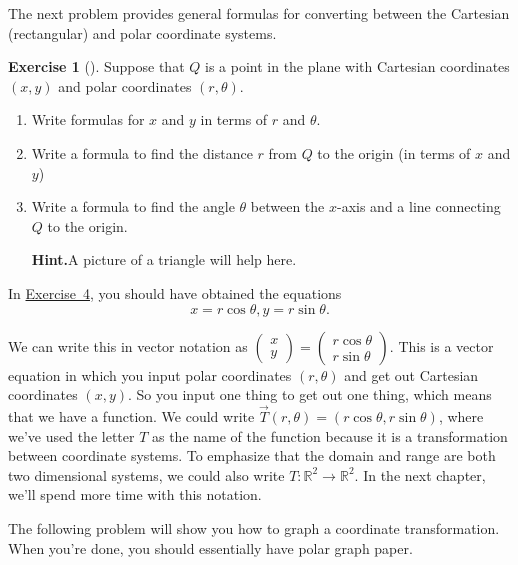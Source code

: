 \documentclass[10pt,]{book}
\theoremstyle{plain}
\theoremstyle{definition}
\theoremstyle{definition}
\theoremstyle{definition}
\theoremstyle{definition}
\newtheorem{exploration}[project]{Exercise}
\theoremstyle{definition}
\numberwithin{equation}{section}
\begin{document}
The next problem provides general formulas for converting between the Cartesian (rectangular) and polar coordinate systems.%
\begin{exploration}[]\label{prob_polar_coordinate_equations}
Suppose that \(Q\) is a point in the plane with Cartesian coordinates \((x,y)\) and polar coordinates \((r,\theta)\).%
\begin{enumerate}[font=\bfseries,label=(\alph*),ref=\alph*]
\item\label{task-142} Write formulas for \(x\) and \(y\) in terms of \(r\) and \(\theta\).%
\item\label{task-143} Write a formula to find the distance \(r\) from \(Q\) to the origin (in terms of \(x\) and \(y\))%
\item\label{task-144} Write a formula to find the angle \(\theta\) between the \(x\)-axis and a line connecting \(Q\) to the origin.%
\par\medskip\noindent%
\textbf{Hint.}\quad A picture of a triangle will help here.%
\end{enumerate}
\end{exploration}
In \hyperref[prob_polar_coordinate_equations]{Exercise~4}, you should have obtained the equations%
\begin{equation*}
x=r\cos\theta,  y=r\sin\theta.
\end{equation*}
%
\par
We can write this in vector notation as \(\begin{pmatrix}x\\y
\end{pmatrix} =\begin{pmatrix}r\cos\theta\\ r\sin\theta
\end{pmatrix}\). This is a vector equation in which you input polar coordinates \((r,\theta)\) and get out Cartesian coordinates \((x,y)\). So you input one thing to get out one thing, which means that we have a function. We could write \(\vec T(r,\theta) = (r\cos\theta,r\sin\theta)\), where we've used the letter \(T\) as the name of the function because it is a transformation between coordinate systems. To emphasize that the domain and range are both two dimensional systems, we could also write \(T:\mathbb{R}^2\to\mathbb{R}^2\). In the next chapter, we'll spend more time with this notation.%
\par
The following problem will show you how to graph a coordinate transformation. When you're done, you should essentially have polar graph paper.%
\end{document}
